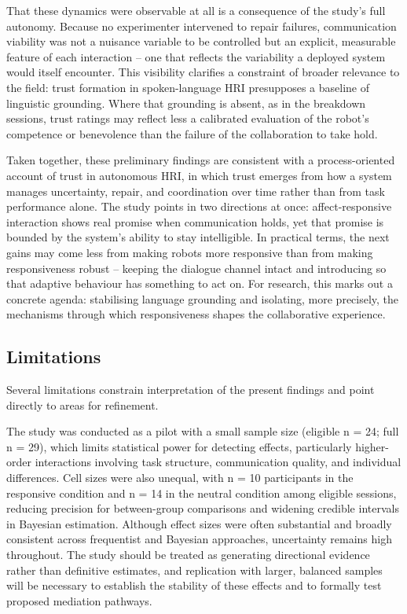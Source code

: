 \documentclass[
  authoryear,
  doubleblind,
  3p]{elsarticle}
\begin{document}
That these dynamics were observable at all is a consequence of the
study's full autonomy. Because no experimenter intervened to repair
failures, communication viability was not a nuisance variable to be
controlled but an explicit, measurable feature of each interaction --
one that reflects the variability a deployed system would itself
encounter. This visibility clarifies a constraint of broader relevance
to the field: trust formation in spoken-language HRI presupposes a
baseline of linguistic grounding. Where that grounding is absent, as in
the breakdown sessions, trust ratings may reflect less a calibrated
evaluation of the robot's competence or benevolence than the failure of
the collaboration to take hold.

Taken together, these preliminary findings are consistent with a
process-oriented account of trust in autonomous HRI, in which trust
emerges from how a system manages uncertainty, repair, and coordination
over time rather than from task performance alone. The study points in
two directions at once: affect-responsive interaction shows real promise
when communication holds, yet that promise is bounded by the system's
ability to stay intelligible. In practical terms, the next gains may
come less from making robots more responsive than from making
responsiveness robust -- keeping the dialogue channel intact and
introducing so that adaptive behaviour has something to act on. For
research, this marks out a concrete agenda: stabilising language
grounding and isolating, more precisely, the mechanisms through which
responsiveness shapes the collaborative experience.

\subsection{Limitations}\label{limitations}

Several limitations constrain interpretation of the present findings and
point directly to areas for refinement.

The study was conducted as a pilot with a small sample size (eligible n
= 24; full n = 29), which limits statistical power for detecting
effects, particularly higher-order interactions involving task
structure, communication quality, and individual differences. Cell sizes
were also unequal, with n = 10 participants in the responsive condition
and n = 14 in the neutral condition among eligible sessions, reducing
precision for between-group comparisons and widening credible intervals
in Bayesian estimation. Although effect sizes were often substantial and
broadly consistent across frequentist and Bayesian approaches,
uncertainty remains high throughout. The study should be treated as
generating directional evidence rather than definitive estimates, and
replication with larger, balanced samples will be necessary to establish
the stability of these effects and to formally test proposed mediation
pathways.
\end{document}
